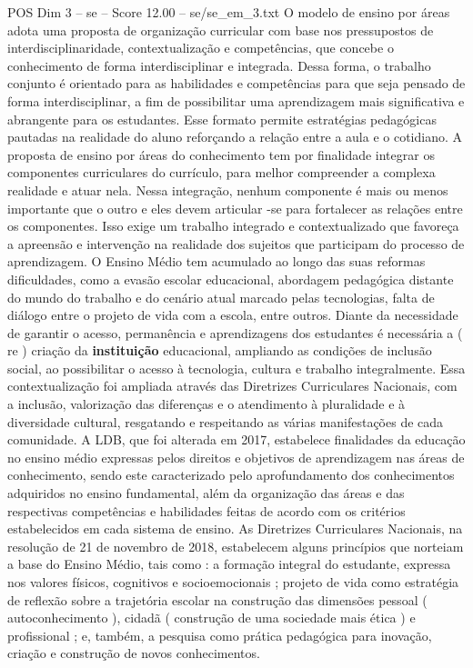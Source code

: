 \begin{textsample}{POS Dim 3 – se – Score 12.00 – se/se\_em\_3.txt}
O modelo de ensino por áreas adota uma proposta de organização curricular com base nos pressupostos de interdisciplinaridade, contextualização e competências, que concebe o conhecimento de forma interdisciplinar e integrada.
Dessa forma, o trabalho conjunto é orientado para as habilidades e competências para que seja pensado de forma interdisciplinar, a fim de possibilitar uma aprendizagem mais significativa e abrangente para os estudantes.
Esse formato permite estratégias pedagógicas pautadas na realidade do aluno reforçando a relação entre a aula e o cotidiano.
A proposta de ensino por áreas do conhecimento tem por finalidade integrar os componentes curriculares do currículo, para melhor compreender a complexa realidade e atuar nela.
Nessa integração, nenhum componente é mais ou menos importante que o outro e eles devem articular -se para fortalecer as relações entre os componentes.
Isso exige um trabalho integrado e contextualizado que favoreça a apreensão e intervenção na realidade dos sujeitos que participam do processo de aprendizagem.
O Ensino Médio tem acumulado ao longo das suas reformas dificuldades, como a evasão escolar educacional, abordagem pedagógica distante do mundo do trabalho e do cenário atual marcado pelas tecnologias, falta de diálogo entre o projeto de vida com a escola, entre outros.
Diante da necessidade de garantir o acesso, permanência e aprendizagens dos estudantes é necessária a ( re ) criação da \textbf{instituição} educacional, ampliando as condições de inclusão social, ao possibilitar o acesso à tecnologia, cultura e trabalho integralmente.
Essa contextualização foi ampliada através das Diretrizes Curriculares Nacionais, com a inclusão, valorização das diferenças e o atendimento à pluralidade e à diversidade cultural, resgatando e respeitando as várias manifestações de cada comunidade.
A LDB, que foi alterada em 2017, estabelece finalidades da educação no ensino médio expressas pelos direitos e objetivos de aprendizagem nas áreas de conhecimento, sendo este caracterizado pelo aprofundamento dos conhecimentos adquiridos no ensino fundamental, além da organização das áreas e das respectivas competências e habilidades feitas de acordo com os critérios estabelecidos em cada sistema de ensino.
As Diretrizes Curriculares Nacionais, na resolução de 21 de novembro de 2018, estabelecem alguns princípios que norteiam a base do Ensino Médio, tais como : a formação integral do estudante, expressa nos valores físicos, cognitivos e socioemocionais ; projeto de vida como estratégia de reflexão sobre a trajetória escolar na construção das dimensões pessoal ( autoconhecimento ), cidadã ( construção de uma sociedade mais ética ) e profissional ; e, também, a pesquisa como prática pedagógica para inovação, criação e construção de novos conhecimentos.

\end{textsample}
